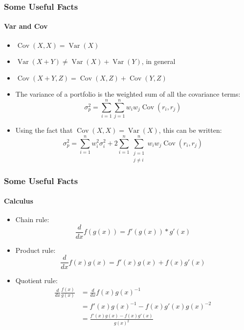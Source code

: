 \documentclass{beamer}
\begin{document}
\begin{foundframe}[t]
    \frametitle{Some Useful Facts}

    \framesubtitle{Var and Cov}

    \begin{itemize}
        \item $\operatorname{Cov}(X,X) = \operatorname{Var}(X)$
        \item $\operatorname{Var}(X+Y) \neq \operatorname{Var}(X) + \operatorname{Var}(Y)$, in general
        \item $\operatorname{Cov}(X+Y,Z) = \operatorname{Cov}(X,Z) + \operatorname{Cov}(Y,Z)$
        \item  The variance of a portfolio is the weighted sum of all the covariance terms: 
        $$\sigma_p^2 = \sum_{i=1}^{n}\sum_{j=1}^{n}
                w_iw_j\operatorname{Cov}(r_i,r_j)$$
        \item Using the fact that $\operatorname{Cov}(X,X) = \operatorname{Var}(X)$, this can be written:
        $$\sigma_p^2 = \sum_{i=1}^{n}w_i^2\sigma_i^2 + 2\sum_{i=1}^{n}
    \sum_{\substack{j=1\\j\neq i}}^{n} w_iw_j\operatorname{Cov}(r_i,r_j)$$
        
    \end{itemize}

\end{foundframe}

\begin{foundframe}[t]
    \frametitle{Some Useful Facts}
    \framesubtitle{Calculus}

    \begin{itemize}
        \item Chain rule: 
        $$\frac{d}{dx}f(g(x)) = f'(g(x))*g'(x)$$
        \item Product rule: 
        $$\frac{d}{dx}f(x)g(x) = f'(x)g(x) + f(x)g'(x)$$
        \item Quotient rule: 
        \begin{align*}
            \frac{d}{dx}\frac{f(x)}{g(x)} &= \frac{d}{dx}f(x)g(x)^{-1}\\
            &= f'(x)g(x)^{-1} - f(x)g'(x)g(x)^{-2} \\
            &= \frac{f'(x)g(x) - f(x)g'(x)}{g(x)^2}
        \end{align*} 
    \end{itemize}

\end{foundframe}
\end{document}
